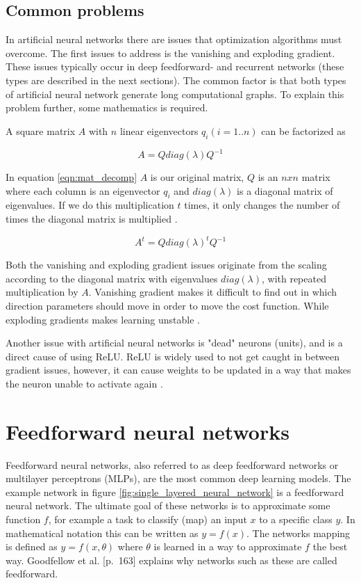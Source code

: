 \subsection{Common problems}
\label{vanishing-gradient}
\label{exploding-gradient}
\label{dead-neurons}
In artificial neural networks there are issues that optimization algorithms must overcome. The first issues to address is the vanishing and exploding gradient. These issues typically occur in deep feedforward- and recurrent networks (these types are described in the next sections). The common factor is that both types of artificial neural network generate long computational graphs. To explain this problem further, some mathematics is required.

A square matrix $A$ with $n$ linear eigenvectors $q_i (i=1..n)$ can be factorized as

\begin{equation} \label{eqn:mat_decomp}
    A=Q diag(\lambda) Q^{-1} 
\end{equation}

In equation \ref{eqn:mat_decomp} $A$ is our original matrix, $Q$ is an $nxn$ matrix where each column is an eigenvector $q_i$ and $diag(\lambda)$ is a diagonal matrix of eigenvalues. If we do this multiplication $t$ times, it only changes the number of times the diagonal matrix is multiplied \cite{weisstein_eigen_????}.

\begin{equation} \label{eqn:mat_decomp_t}
    A^{t} = Q diag(\lambda)^{t} Q^{-1}
\end{equation}

Both the vanishing and exploding gradient issues originate from the scaling according to the diagonal matrix with eigenvalues $diag(\lambda)$, with repeated multiplication by $A$. Vanishing gradient makes it difficult to find out in which direction parameters should move in order to move the cost function. While exploding gradients makes learning unstable \cite{goodfellow_deep_2016}.

Another issue with artificial neural networks is "dead" neurons (units), and is a direct cause of using ReLU. ReLU is widely used to not get caught in between gradient issues, however, it can cause weights to be updated in a way that makes the neuron unable to activate again \cite{_cs231n_????}.

\section{Feedforward neural networks}
% 
Feedforward neural networks, also referred to as deep feedforward networks or multilayer perceptrons (MLPs), are the most common deep learning models. The example network in figure \ref{fig:single_layered_neural_network} is a feedforward neural network. The ultimate goal of these networks is to approximate some function $f$, for example a task to classify (map) an input $x$ to a specific class $y$. In mathematical notation this can be written as $y = f(x)$. The networks mapping is defined as $y = f(x,\theta)$ where $\theta$ is learned in a way to approximate $f$ the best way. Goodfellow et al. \cite{goodfellow_deep_2016}[p.~163] explains why networks such as these are called feedforward.

